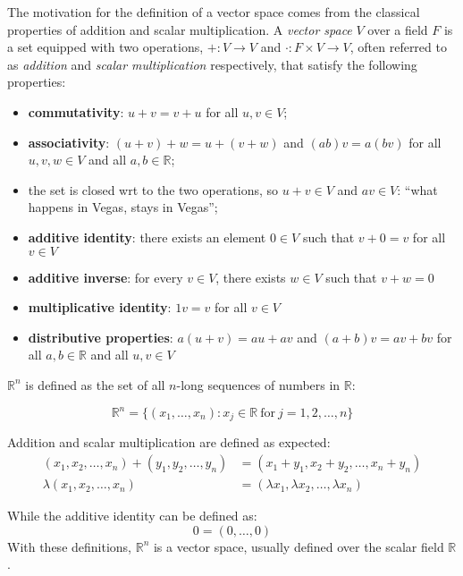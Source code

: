 
The motivation for the definition of a vector space comes from the classical properties of addition and scalar multiplication.
A \emph{vector space} $V$ over a field $F$ is a set equipped with two operations, $+: V \to V$ and $\cdot: F \times V \to V$, often referred to as \emph{addition} and \emph{scalar multiplication} respectively, that satisfy the following properties:

\begin{itemize}
\item \textbf{commutativity}: $u+v = v+u$ for all $u,v\in V$;

\item \textbf{associativity}: $(u+v)+w = u+(v+w)$ and $(ab)v=a(bv)$ for all $u,v,w\in V$ and all $a,b\in\mathbb{R}$; 
\item the set is closed wrt to the two operations, so $u+v\in V$ and $av\in V$: ``what happens in Vegas, stays in Vegas'';


\item \textbf{additive identity}: there exists an element $0\in V$ such that $v+0=v$ for all $v\in V$

\item \textbf{additive inverse}: for every $v\in V$, there exists $w\in V$ such that $v+w=0$

\item \textbf{multiplicative identity}: $1v = v$ for all $v\in V$

\item \textbf{distributive properties}: $a(u+v)=au+av$ and $(a+b)v=av+bv$ for all $a,b\in\mathbb{R}$ and all $u,v\in V$
\end{itemize}

$\mathbb{R}^n$ is defined as the set of all $n$-long sequences of numbers in $\mathbb{R}$:

\[
\mathbb{R}^n = \{ (x_1,\dots,x_n) : x_j \in \mathbb{R} ~\mathrm{for}~ j=1,2,\dots,n\}
\]

{
\medskip
Addition and scalar multiplication are defined as expected:
%
\begin{align*}
(x_1,x_2,\dots,x_n) + (y_1,y_2,\dots,y_n) &= (x_1+y_1,x_2+y_2,\dots,x_n+y_n)\\
\lambda (x_1, x_2,\dots,x_n) &= (\lambda x_1, \lambda x_2, \dots, \lambda x_n)
\end{align*}
}

While the additive identity can be defined as:
\[ 0 = (0, \dots , 0) \]
With these definitions, $\mathbb{R}^n$ is a vector space, usually defined over the scalar field $\mathbb{R}$.

